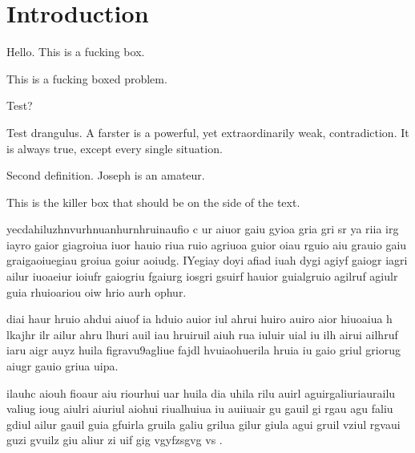 \chapter{Introduction}



Hello. This is a fucking box.	




\begin{prblm}
This is a fucking boxed problem.	
\end{prblm}
	



\begin{prblm}
	Test?
\end{prblm}


\begin{pres_defn}[Farster]
Test drangulus. A farster is a powerful, yet extraordinarily weak, contradiction. It is always true, except every single situation.
	
\end{pres_defn}


\begin{defn}
Second definition. Joseph is an amateur.
\end{defn}

\begin{WrapBoxR}
This is the killer box that should be on the side of the text.	
\end{WrapBoxR}


yecdahiluzhnvurhnuanhurnhruinaufio c ur aiuor gaiu gyioa gria gri sr ya riia irg iayro gaior giagroiua iuor hauio riua ruio agriuoa guior oiau rguio aiu grauio gaiu graigaoiuegiau groiua goiur aoiudg. IYegiay doyi afiad iuah dygi agiyf gaiogr iagri ailur iuoaeiur ioiufr gaiogriu fgaiurg iosgri gsuirf hauior guialgruio agilruf agiulr guia rhuioariou oiw hrio aurh ophur.


\begin{WrapBoxL}
diai haur hruio ahdui aiuof ia hduio auior iul ahrui huiro auiro aior hiuoaiua h lkajhr ilr ailur ahru lhuri auil iau hruiruil aiuh rua iuluir uial iu ilh airui ailhruf iaru aigr auyz huila figravu9agliue fajdl hvuiaohuerila hruia iu gaio griul griorug aiugr gauio griua uipa.	
\end{WrapBoxL}



ilauhc aiouh fioaur aiu riourhui uar huila dia uhila rilu auirl aguirgaliuriaurailu valiug ioug aiulri aiuriul aiohui riualhuiua iu auiiuair gu gauil gi rgau agu faliu gdiul ailur gauil guia gfuirla gruila galiu grilua gilur giula agui gruil vziul rgvaui guzi gvuilz giu aliur zi uif gig vgyfzsgvg vs .

